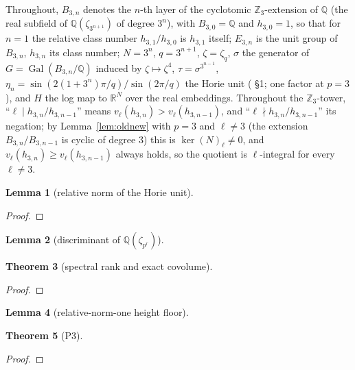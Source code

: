 \documentclass[11pt]{amsart}
\newtheorem{theorem}{Theorem}[section]
\newtheorem{lemma}[theorem]{Lemma}
\theoremstyle{remark}\newtheorem{remark}[theorem]{Remark}
\theoremstyle{definition}\newtheorem{definition}[theorem]{Definition}
\theoremstyle{definition}\newtheorem{algorithm}[theorem]{Algorithm}
\newcommand{\Q}{\mathbb{Q}}\newcommand{\Z}{\mathbb{Z}}\newcommand{\R}{\mathbb{R}}\newcommand{\F}{\mathbb{F}}
\providecommand{\proofsdir}{../../proofs} %
\begin{document}
Throughout, $B_{3,n}$ denotes the $n$-th layer of the cyclotomic $\Z_3$-extension of $\Q$ (the real subfield of $\Q(\zeta_{3^{n+1}})$ of degree $3^n$), with $B_{3,0}=\Q$ and $h_{3,0}=1$, so that for $n=1$ the relative class number $h_{3,1}/h_{3,0}$ is $h_{3,1}$ itself; $E_{3,n}$ is the unit group of $B_{3,n}$, $h_{3,n}$ its class number; $N=3^n$, $q=3^{n+1}$, $\zeta=\zeta_q$, $\sigma$ the generator of $G=\operatorname{Gal}(B_{3,n}/\Q)$ induced by $\zeta\mapsto\zeta^4$, $\tau=\sigma^{3^{n-1}}$, $\eta_n=\sin(2(1+3^n)\pi/q)/\sin(2\pi/q)$ the Horie unit (\cite{MO13} \S1; one factor at $p=3$), and $H$ the log map to $\R^{N}$ over the real embeddings. Throughout the $\Z_3$-tower, ``$\ell\mid h_{3,n}/h_{3,n-1}$'' means $v_\ell(h_{3,n})>v_\ell(h_{3,n-1})$, and ``$\ell\nmid h_{3,n}/h_{3,n-1}$'' its negation; by Lemma~\ref{lem:oldnew} with $p=3$ and $\ell\ne3$ (the extension $B_{3,n}/B_{3,n-1}$ is cyclic of degree $3$) this is $\ker(N)_\ell\ne0$, and $v_\ell(h_{3,n})\ge v_\ell(h_{3,n-1})$ always holds, so the quotient is $\ell$-integral for every $\ell\ne3$.
\begin{lemma}[relative norm of the Horie unit]\label{lem:normone}

\end{lemma}
\begin{proof}

\end{proof}
\begin{lemma}[discriminant of $\mathbb{Q}(\zeta_{p^r})$]\label{lem:disc}

\end{lemma}
\begin{theorem}[spectral rank and exact covolume]\label{thm:rank3}

\end{theorem}
\begin{proof}

\end{proof}
\begin{lemma}[relative-norm-one height floor]\label{lem:mo25-z3}

\end{lemma}
\begin{theorem}[P3]\label{thm:P3}

\end{theorem}
\begin{proof}

\end{proof}
\end{document}
